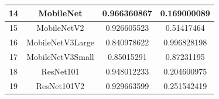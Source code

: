 \begin{table}[h!]
{\begin{tabular}{|c|c|c|c|}
14                                                             & MobileNet         & 0.966360867         & 0.169000089            \\ \hline
15                                                             & MobileNetV2       & 0.926605523         & 0.51417464             \\ \hline
16                                                             & MobileNetV3Large  & 0.840978622         & 0.996828198            \\ \hline
17                                                             & MobileNetV3Small  & 0.85015291          & 0.87231195             \\ \hline
18                                                             & ResNet101         & 0.948012233         & 0.204600975            \\ \hline
19                                                             & ResNet101V2       & 0.929663599         & 0.251542419            \\ \hline
\end{tabular}%
}
\end{table}


